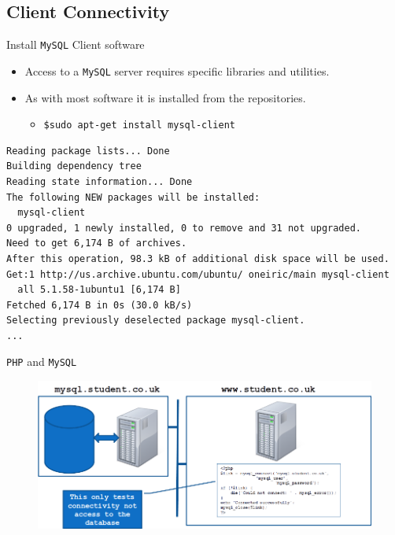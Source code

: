 \documentclass[xcolor=table]{beamer}
\begin{document}
\subsection{Client Connectivity}
\begin{frame}[fragile]{Install \texttt{MySQL} Client software}
  \begin{itemize}
    \item Access to a \texttt{MySQL} server requires specific libraries and utilities.
    \item As with most software it is installed from the repositories.
      \begin{itemize}
        \item \texttt{\$sudo apt-get install mysql-client}
      \end{itemize}
  \end{itemize}
  \begin{tcolorbox}
    \lstset{
      basicstyle=\tiny\ttfamily,
    }
    \begin{lstlisting}
Reading package lists... Done
Building dependency tree
Reading state information... Done
The following NEW packages will be installed:
  mysql-client
0 upgraded, 1 newly installed, 0 to remove and 31 not upgraded.
Need to get 6,174 B of archives.
After this operation, 98.3 kB of additional disk space will be used.
Get:1 http://us.archive.ubuntu.com/ubuntu/ oneiric/main mysql-client 
  all 5.1.58-1ubuntu1 [6,174 B]
Fetched 6,174 B in 0s (30.0 kB/s)
Selecting previously deselected package mysql-client.
...
    \end{lstlisting}
  \end{tcolorbox}
\end{frame}

\begin{frame}{\texttt{PHP} and \texttt{MySQL}}
  \begin{figure}
    \begin{center}
      \includegraphics[width=1\linewidth]{Connectivity.png}
    \end{center}
  \end{figure}
\end{frame}
\end{document}
